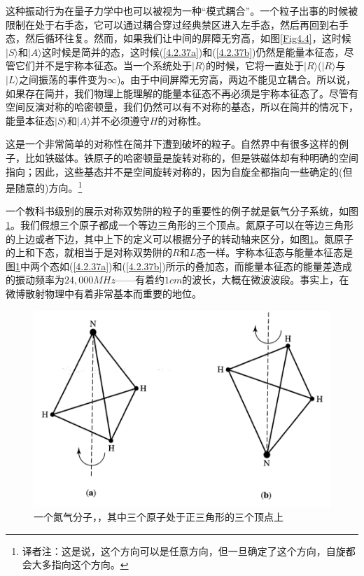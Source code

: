\documentclass[UTF8,twoside]{ctexart}
\begin{document}
\noindent 这种振动行为在量子力学中也可以被视为一种“模式耦合”。一个粒子出事的时候被限制在处于右手态，它可以通过耦合穿过经典禁区进入左手态，然后再回到右手态，然后循环往复。然而，如果我们让中间的屏障无穷高，如图{\ref{Fig4.4}}，这时候$|S\rangle$和$|A\rangle$这时候是简并的态，这时候(\ref{4.2.37a})和(\ref{4.2.37b})仍然是能量本征态，尽管它们并不是宇称本征态。当一个系统处于$|R\rangle$的时候，它将一直处于$|R\rangle$($|R\rangle$与$|L\rangle$之间振荡的事件变为$\infty$)。由于中间屏障无穷高，两边不能见立耦合。所以说，如果存在简并，我们物理上能理解的能量本征态不再必须是宇称本征态了。尽管有空间反演对称的哈密顿量，我们仍然可以有不对称的基态，所以在简并的情况下，能量本征态$|S\rangle$和$|A\rangle$并不必须遵守$H$的对称性。

这是一个非常简单的对称性在简并下遭到破坏的粒子。自然界中有很多这样的例子，比如铁磁体。铁原子的哈密顿量是旋转对称的，但是铁磁体却有种明确的空间指向；因此，这些基态并不是空间旋转对称的，因为自旋全都指向一些确定的(但是随意的)方向。\footnote{译者注：这是说，这个方向可以是任意方向，但一旦确定了这个方向，自旋都会大多指向这个方向。}

一个教科书级别的展示对称双势阱的粒子的重要性的例子就是氨气分子系统，如图{\ref{Fig4.5}}。我们假想三个原子都成一个等边三角形的三个顶点。氮原子可以在等边三角形的上边或者下边，其中上下的定义可以根据分子的转动轴来区分，如图{\ref{Fig4.5}}。氮原子的上和下态，就相当于是对称双势阱的$R$和$L$态一样。宇称本征态与能量本征态是图{\ref{Fig4.5}}中两个态如(\ref{4.2.37a})和(\ref{4.2.37b})所示的叠加态，而能量本征态的能量差造成的振动频率为$24,000MHz$——有着约$1cm$的波长，大概在微波波段。事实上，在微博散射物理中有着非常基本而重要的地位。

\begin{figure}
\begin{centering}
\includegraphics[width = 12.4cm]{./Sakurai/Fig_4.5.png}
\caption{一个氮气分子，，其中三个原子处于正三角形的三个顶点上}
\label {Fig4.5}
\end{centering}
\end{figure}
\end{document}
